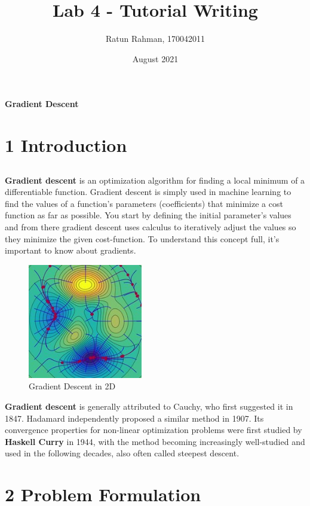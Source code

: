 \documentclass[11pt]{article}
\title{Lab 4 - Tutorial Writing}
\author{Ratun Rahman, 170042011}
\date{August 2021}
\begin{document}
\begin{titlepage}
\maketitle
\end{titlepage}

\begin{center} \Huge{\textbf{Gradient Descent}}
\end{center}
\section*{1 Introduction}
\subsection*{}
\textbf{Gradient descent} is an optimization algorithm for finding a local minimum of a differentiable function. Gradient descent is simply used in machine learning to find the values of a function's parameters (coefficients) that minimize a cost function as far as possible. You start by defining the initial parameter's values and from there gradient descent uses calculus to iteratively adjust the values so they minimize the given cost-function. To understand this concept full, it's important to know about gradients. \\
\begin{figure}[htp]
    \centering
    \includegraphics[width=5cm]{photo/1.jpg}
    \caption{Gradient Descent in 2D}
    \label{fig:ss1}
\end{figure}
\textbf{Gradient descent} is generally attributed to Cauchy, who first suggested it in 1847. Hadamard independently proposed a similar method in 1907. Its convergence properties for non-linear optimization problems were first studied by \textbf{Haskell Curry} in 1944, with the method becoming increasingly well-studied and used in the following decades, also often called steepest descent. 

\section*{2 Problem Formulation}
\end{document}
